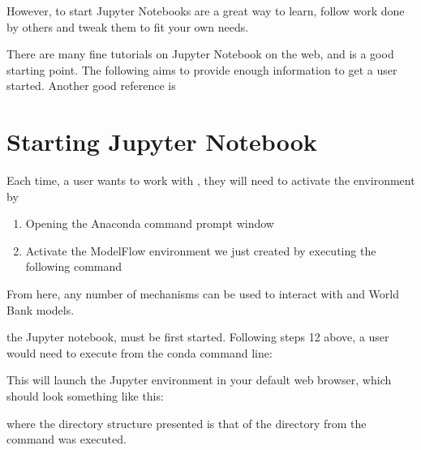 \documentclass[letterpaper,10pt,english]{jupyterBook}
\begin{document}
\sphinxAtStartPar
However, to start Jupyter Notebooks are a great way to learn, follow work done by others and tweak them to fit your own needs.

\sphinxAtStartPar
There are many fine tutorials on Jupyter Notebook on the web, and  is a good starting point. The following aims to provide enough information to get a user started.  Another good reference is 


\section{Starting Jupyter Notebook}
\label{\detokenize{content/04_PythonEssentials/Intro_Jupyter_notebook:starting-jupyter-notebook}}
\sphinxAtStartPar
Each time, a user wants to work with , they will need to activate the  environment by
\begin{enumerate}
%
\item {} 
\sphinxAtStartPar
Opening the Anaconda command prompt window

\item {} 
\sphinxAtStartPar
Activate the ModelFlow environment we just created by executing the following command

\end{enumerate}

\sphinxAtStartPar
{}

\sphinxAtStartPar
From here, any number of mechanisms can be used to interact with  and World Bank models.

\sphinxAtStartPar
{} the Jupyter notebook, must be first started.  Following steps 1\sphinxhyphen{}2 above, a user would need to execute from the conda command line:

\sphinxAtStartPar
{}

\sphinxAtStartPar
This will launch the Jupyter environment in your default web browser, which should look something like this:

\sphinxAtStartPar
{}

\sphinxAtStartPar
where the directory structure presented is that of the directory from the  command was executed.
\end{document}
